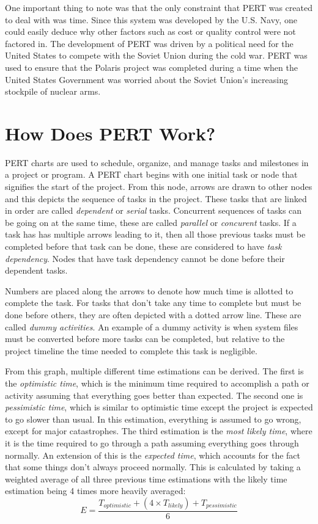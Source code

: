 \documentclass[12pt]{article}
\begin{document}
One important thing to note was that the only constraint that PERT was created to deal with was time.
Since this system was developed by the U.S. Navy, one could easily deduce why other factors such as cost or quality control were not factored in.
The development of PERT was driven by a political need for the United States to compete with the Soviet Union during the cold war.
PERT was used to ensure that the Polaris project was completed during a time when the United States Government was worried about the Soviet Union's increasing stockpile of nuclear arms.
\section{How Does PERT Work?}
PERT charts are used to schedule, organize, and manage tasks and milestones in a project or program.
A PERT chart begins with one initial task or node that signifies the start of the project.
From this node, arrows are drawn to other nodes and this depicts the sequence of tasks in the project.  These tasks that are linked in order are called \textit{dependent} or \textit{serial} tasks.
Concurrent sequences of tasks can be going on at the same time, these are called \textit{parallel} or \textit{concurent} tasks.
If a task has has multiple arrows leading to it, then all those previous tasks must be completed before that task can be done, these are considered to have \textit{task dependency}.  Nodes that have task dependency cannot be done before their dependent tasks.

Numbers are placed along the arrows to denote how much time is allotted to complete the task.
For tasks that don't take any time to complete but must be done before others, they are often depicted with a dotted arrow line.  These are called \textit{dummy activities}.
An example of a dummy activity is when system files must be converted before more tasks can be completed, but relative to the project timeline the time needed to complete this task is negligible.

From this graph, multiple different time estimations can be derived.
The first is the \textit{optimistic time}, which is the minimum time required to accomplish a path or activity assuming that everything goes better than expected.
The second one is \textit{pessimistic time}, which is similar to optimistic time except the project is expected to go slower than usual.
In this estimation, everything is assumed to go wrong, except for major catastrophes.
The third estimation is the \textit{most likely time}, where it is the time required to go through a path assuming everything goes through normally.
An extension of this is the \textit{expected time}, which accounts for the fact that some things don't always proceed normally.
This is calculated by taking a weighted average of all three previous time estimations with the likely time estimation being 4 times more heavily averaged:
\[ E = \frac{T_{optimistic} + \left( 4 \times T_{likely} \right) + T_{pessimistic}}{6} \]
\end{document}

